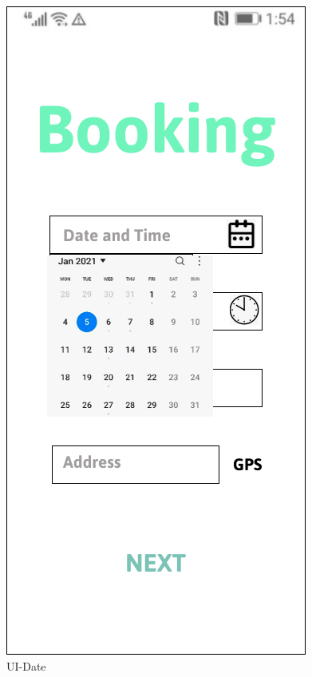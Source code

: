 \documentclass[a4paper,12pt]{report}
\begin{document}
\begin{figure}[H]
	\begin{minipage}[t]{0.56\linewidth}
		\centering
		\includegraphics[scale=0.5]{UI-Date.png}
		\caption{UI-Date}
		\label{fig:UI-Date}
	\end{minipage}%
	\begin{minipage}[t]{0.56\linewidth}
		\centering

\end{minipage}
\end{figure}
\end{document}
